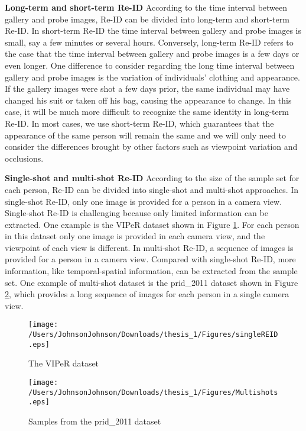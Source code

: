 \textbf{Long-term and short-term Re-ID} According to the time interval between gallery and probe images, Re-ID can be divided into long-term and short-term Re-ID.  In short-term Re-ID the time interval between gallery and probe images is small, say a few minutes or several hours. Conversely, long-term Re-ID refers to the case that the time interval between gallery and probe images is a few days or even longer. One difference to consider regarding the long time interval between gallery and probe images is the variation of individuals' clothing and appearance. If the gallery images were shot a few days prior, the same individual may have changed his suit or taken off his bag, causing the appearance to change. In this case, it will be much more difficult to recognize the same identity in long-term Re-ID. In most cases, we use short-term Re-ID, which guarantees that the appearance of the same person will remain the same and we will only need to consider the differences brought by other factors such as viewpoint variation and occlusions.


\textbf{Single-shot and multi-shot Re-ID} According to the size of the sample set for each person, Re-ID can be divided into single-shot and multi-shot approaches. In single-shot Re-ID, only one image is provided for a person in a camera view. Single-shot Re-ID is challenging because only limited information can be extracted. One example is the VIPeR dataset shown in Figure \ref{VIPeRimages}. For each person in this dataset only one image is provided in each camera view, and the viewpoint of each view is different. In multi-shot Re-ID, a sequence of images is provided for a person in a camera view. Compared with single-shot Re-ID, more information, like temporal-spatial information, can be extracted from the sample set. One example of multi-shot dataset is the prid\_2011 dataset shown in Figure \ref{PRID2011images}, which provides a long sequence of images for each person in a single camera view.

\begin{figure}[H]

\texttt{[image: /Users/JohnsonJohnson/Downloads/thesis\_1/Figures/singleREID.eps]}
\vspace{-3em}
\caption{The VIPeR dataset}
\label{VIPeRimages}
\end{figure}


\begin{figure}[H]

\texttt{[image: /Users/JohnsonJohnson/Downloads/thesis\_1/Figures/Multishots.eps]}
\vspace{-3em}
\caption{Samples from the prid\_2011 dataset}
\label{PRID2011images}
\end{figure}


